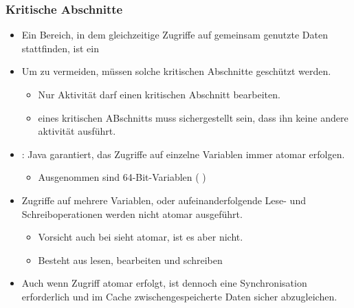 \subsubsection{Kritische Abschnitte}
\begin{itemize}
    \item Ein Bereich, in dem gleichzeitige Zugriffe auf gemeinsam genutzte Daten stattfinden, ist ein 
    \item Um  zu vermeiden, müssen solche kritischen Abschnitte geschützt werden.
    \begin{itemize}
        \item Nur  Aktivität darf einen kritischen Abschnitt  bearbeiten.
        \item {} eines kritischen ABschnitts muss sichergestellt sein, dass ihn keine andere aktivität ausführt.
    \end{itemize}
    \item {}: Java garantiert, das Zugriffe auf einzelne Variablen immer atomar erfolgen.
    \begin{itemize}
        \item Ausgenommen sind 64-Bit-Variablen ( )
    \end{itemize}
    \item Zugriffe auf mehrere Variablen, oder aufeinanderfolgende Lese- und Schreiboperationen werden nicht atomar ausgeführt.
    \begin{itemize}
        \item Vorsicht auch bei  sieht atomar, ist es aber nicht.
        \item Besteht aus lesen, bearbeiten und schreiben
    \end{itemize}
    \item Auch wenn Zugriff atomar erfolgt, ist dennoch eine Synchronisation erforderlich und im Cache zwischengespeicherte Daten sicher abzugleichen.
\end{itemize}


\vspace{0.5cm}

